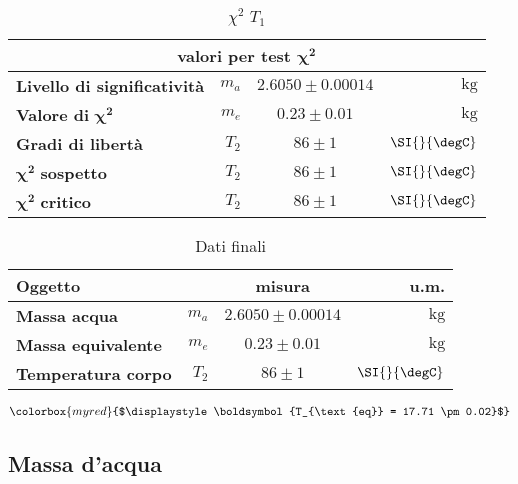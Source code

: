 \documentclass{article}
\newcommand{\rosso}[1]{\colorbox{myred}{$\displaystyle #1$}}
\begin{document}
	
	\begin{table}[H] \centering
		\begin{small}
			\begin{tabular}{@{}lrcr@{}}\toprule
				\multicolumn{4}{c}{\textbf{valori per test} \(\boldsymbol{\chi^2}\)}\\ \midrule
				\textbf{Livello di significatività}		 &  \(m_{a}\) &\(2.6050 \pm 0.00014\)\footnotemark  & \(\SI{}{\kilogram}\) \\  \hdashline
				\textbf{Valore di} \(\boldsymbol{\chi^2}\)	 & \(m_{e}\)  &\(0.23	\pm 0.01 \) & \(\SI{}{\kilogram}\)   \\  \hdashline
				\textbf{Gradi di libertà}		 & \(T_{2}\)  &\(86 \pm 1\) & \(\SI{}{\degC}\)   \\   \hdashline
				\(\boldsymbol{\chi^2}\) \textbf{sospetto}		& \(T_{2}\)  &\(86 \pm 1\) & \(\SI{}{\degC}\)   \\ \hdashline
				\(\boldsymbol{\chi^2}\) \textbf{critico}		& \(T_{2}\)  &\(86 \pm 1\) & \(\SI{}{\degC}\)   \\ 
				\bottomrule
			\end{tabular}
		\end{small}
		\caption{\(\chi^2\) \(T_{1}\)}
	\end{table}
	
	
	\begin{table}[H] \centering
		\begin{small}
			\begin{tabular}{@{}lrcr@{}}\toprule
				\textbf{Oggetto}&  & \textbf{misura} & \textbf{u.m.}\\ \midrule
				\textbf{Massa acqua}		 &  \(m_{a}\) &\(2.6050 \pm 0.00014\)\footnotemark  & \(\SI{}{\kilogram}\) \\  \hdashline
				\textbf{Massa equivalente}		 & \(m_{e}\)  &\(0.23	\pm 0.01 \) & \(\SI{}{\kilogram}\)   \\  \hdashline
				\textbf{Temperatura corpo}		 & \(T_{2}\)  &\(86 \pm 1\) & \(\SI{}{\degC}\)   \\   
				\bottomrule
			\end{tabular}
		\end{small}
		\caption{Dati finali}
	\end{table}
	
	
	
	\[ 
	\rosso{\boldsymbol{T_{\text{eq}} = 17.71	\pm 0.02}}
	\]
	
	
	\subsection{Massa d'acqua}
	
\end{document}
